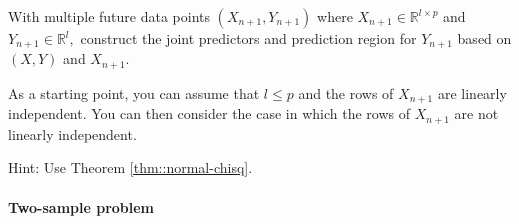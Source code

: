 With multiple future data points $(X_{n+1},Y_{n+1})$ where $X_{n+1}\in\mathbb{R}^{l\times p}$
and $Y_{n+1}\in\mathbb{R}^{l},$ construct the joint predictors and
prediction region for $Y_{n+1}$ based on $(X,Y)$ and $X_{n+1}$. 


As a starting point, you can assume that $l\leq p$ and the rows of $X_{n+1}$ are linearly independent. You can then consider the case in which the rows of $X_{n+1}$ are not linearly independent.  


Hint: Use Theorem \ref{thm::normal-chisq}. 



\paragraph{Two-sample problem}\label{hw5::two-sample}

